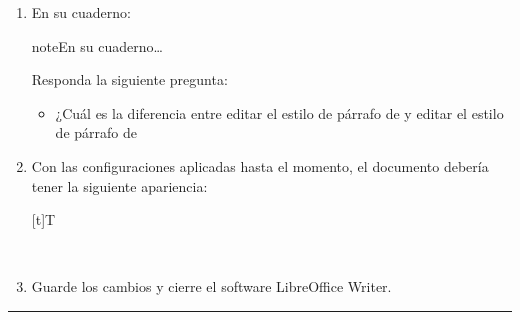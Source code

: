 \documentclass[letterpaper,10pt,spanish]{sphinxmanual}
\let\sphinxpxdimen\pdfpxdimen\else\newdimen\sphinxpxdimen
\begin{document}
\begin{enumerate}
\begin{itemize}
\item {} 
\sphinxAtStartPar
PULSE el botón .

\end{itemize}

\item {} 
\sphinxAtStartPar
En su cuaderno:

\begin{sphinxadmonition}{note}{En su cuaderno…}

\sphinxAtStartPar
Responda la siguiente pregunta:
\begin{itemize}
\item {} 
\sphinxAtStartPar
¿Cuál es la diferencia entre editar el estilo de párrafo de  y editar el estilo de párrafo de 

\end{itemize}
\end{sphinxadmonition}

\item {} 
\sphinxAtStartPar
Con las configuraciones aplicadas hasta el momento, el documento debería tener la siguiente apariencia:


\begin{savenotes}\sphinxattablestart
\sphinxthistablewithglobalstyle
\centering
\begin{tabulary}{\linewidth}[t]{T}
\sphinxtoprule
\sphinxtableatstartofbodyhook

\begin{sphinxfigure-in-table}
\centering

\noindent\sphinxincludegraphics[width=500\sphinxpxdimen]{{image25}.png}
\end{sphinxfigure-in-table}\relax
\\
\sphinxbottomrule
\end{tabulary}
\sphinxtableafterendhook\par
\sphinxattableend\end{savenotes}

\item {} 
\sphinxAtStartPar
Guarde los cambios y cierre el software LibreOffice Writer.

\end{enumerate}


\bigskip\hrule\bigskip
\end{document}
